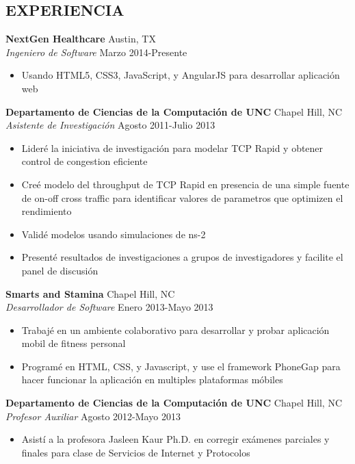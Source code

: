 \documentclass[line,margin,letterpaper]{res}
\begin{document}
\begin{resume}
\section{EXPERIENCIA} 
  {\bf NextGen Healthcare} \hfill Austin, TX \\
  \emph{Ingeniero de Software} \hfill Marzo 2014-Presente
  \begin{itemize} \itemsep -2pt
    \item Usando HTML5, CSS3, JavaScript, y AngularJS para desarrollar 
    aplicaci\'on web
  \end{itemize}
  {\bf Departamento de Ciencias de la Computaci\'on de UNC} \hfill 
    Chapel Hill, NC \\
  \emph{Asistente de Investigaci\'on} \hfill Agosto 2011-Julio 2013
  \begin{itemize} \itemsep -2pt
    \item Lider\'e la iniciativa de investigaci\'on para modelar TCP Rapid y 
    obtener control de congestion eficiente
    \item Cre\'e modelo del throughput de TCP Rapid en presencia de una simple 
    fuente de on-off cross traffic para identificar valores de parametros que 
    optimizen el rendimiento
    \item Valid\'e modelos usando simulaciones de ns-2
    \item Present\'e resultados de investigaciones a grupos de investigadores
    y facilite el panel de discusi\'on
  \end{itemize}
  {\bf Smarts and Stamina} \hfill Chapel Hill, NC \\
  \emph{Desarrollador de Software} \hfill Enero 2013-Mayo 2013
  \begin{itemize} \itemsep -2pt
    \item Trabaj\'e en un ambiente colaborativo para desarrollar y probar 
    aplicaci\'on mobil de fitness personal
    \item Program\'e en HTML, CSS, y Javascript, y use el framework PhoneGap 
    para hacer funcionar la aplicaci\'on en multiples plataformas m\'obiles
  \end{itemize}
  {\bf Departamento de Ciencias de la Computaci\'on de UNC} 
    \hfill Chapel Hill, NC \\
  \emph{Profesor Auxiliar} \hfill Agosto 2012-Mayo 2013
  \begin{itemize} \itemsep -2pt
    \item Asist\'i a la profesora Jasleen Kaur Ph.D. en corregir ex\'amenes 
    parciales y finales para clase de Servicios de Internet y Protocolos

\end{itemize}
\end{resume}
\end{document}
